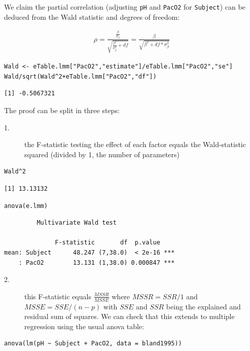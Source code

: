 \documentclass[12pt]{article}
\begin{document}
We claim the partial correlation (adjusting \texttt{pH} and \texttt{PacO2} for
\texttt{Subject}) can be deduced from the Wald statistic and degrees of
freedom:

\begin{align}
\rho = \frac{\frac{\beta}{\sigma_{\beta}}}{\sqrt{\frac{\beta^2}{\sigma^2_{\beta}}+df}} = \frac{\beta}{\sqrt{\beta^2+df*\sigma_{\beta}^2}} \label{eq:pCor-formula}
\end{align}

\lstset{language=r,label= ,caption= ,captionpos=b,numbers=none}
\begin{lstlisting}
Wald <- eTable.lmm["PacO2","estimate"]/eTable.lmm["PacO2","se"]
Wald/sqrt(Wald^2+eTable.lmm["PacO2","df"])
\end{lstlisting}

\begin{verbatim}
[1] -0.5067321
\end{verbatim}


The proof can be split in three steps:
\begin{description}
\item[{1.}] the F-statistic testing the effect of each factor equals the
Wald-statistic squared (divided by 1, the number of parameters)
\end{description}

\lstset{language=r,label= ,caption= ,captionpos=b,numbers=none}
\begin{lstlisting}
Wald^2
\end{lstlisting}

\begin{verbatim}
[1] 13.13132
\end{verbatim}


\lstset{language=r,label= ,caption= ,captionpos=b,numbers=none}
\begin{lstlisting}
anova(e.lmm)
\end{lstlisting}

\begin{verbatim}
	     Multivariate Wald test 

              F-statistic       df  p.value    
mean: Subject      48.247 (7,38.0)  < 2e-16 ***
    : PacO2        13.131 (1,38.0) 0.000847 ***
\end{verbatim}


\begin{description}
\item[{2.}] this F-statistic equals \(\frac{MSSR}{MSSE}\) where \(MSSR =
  SSR/1\) and \(MSSE = SSE/(n-p)\) with \(SSE\) and \(SSR\) being the
explained and residual sum of squares. We can check that this
extends to multiple regression using the usual anova table:
\end{description}
\lstset{language=r,label= ,caption= ,captionpos=b,numbers=none}
\begin{lstlisting}
anova(lm(pH ~ Subject + PacO2, data = bland1995))
\end{lstlisting}
\end{document}
